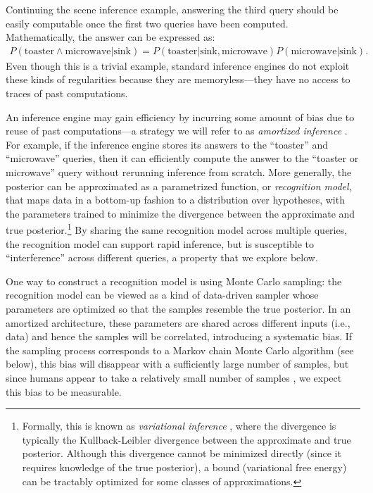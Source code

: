 Continuing the scene inference example, answering the third query should be easily computable once the first two queries have been computed. Mathematically, the answer can be expressed as:
\begin{align}
P(\text{toaster} \wedge \text{microwave}|\text{sink}) = P(\text{toaster}|\text{sink},\text{microwave}) P(\text{microwave}|\text{sink}).
\end{align}
Even though this is a trivial example, standard inference engines do not exploit these kinds of regularities because they are memoryless---they have no access to traces of past computations.

An inference engine may gain efficiency by incurring some amount of bias due to reuse of past computations---a strategy we will refer to as \emph{amortized inference} \citep{stuhlmuller2013learning, gershman2014amortized}. For example, if the inference engine stores its answers to the ``toaster'' and ``microwave'' queries, then it can efficiently compute the answer to the ``toaster or microwave'' query without rerunning inference from scratch. More generally, the posterior can be approximated as a parametrized function, or \emph{recognition model}, that maps data in a bottom-up fashion to a distribution over hypotheses, with the parameters trained to minimize the divergence between the approximate and true posterior.\footnote{Formally, this is known as \emph{variational inference} \citep{jordan1999introduction}, where the divergence is typically the Kullback-Leibler divergence between the approximate and true posterior. Although this divergence cannot be minimized directly (since it requires knowledge of the true posterior), a bound (variational free energy) can be tractably optimized for some classes of approximations.} By sharing the same recognition model across multiple queries, the recognition model can support rapid inference, but is susceptible to ``interference'' across different queries, a property that we explore below.

One way to construct a recognition model is using Monte Carlo sampling: the recognition model can be viewed as a kind of data-driven sampler whose parameters are optimized so that the samples resemble the true posterior. In an amortized architecture, these parameters are shared across different inputs (i.e., data) and hence the samples will be correlated, introducing a systematic bias. If the sampling process corresponds to a Markov chain Monte Carlo algorithm (see below), this bias will disappear with a sufficiently large number of samples, but since humans appear to take a relatively small number of samples \citep{dasgupta17,vul2014one}, we expect this bias to be measurable.


